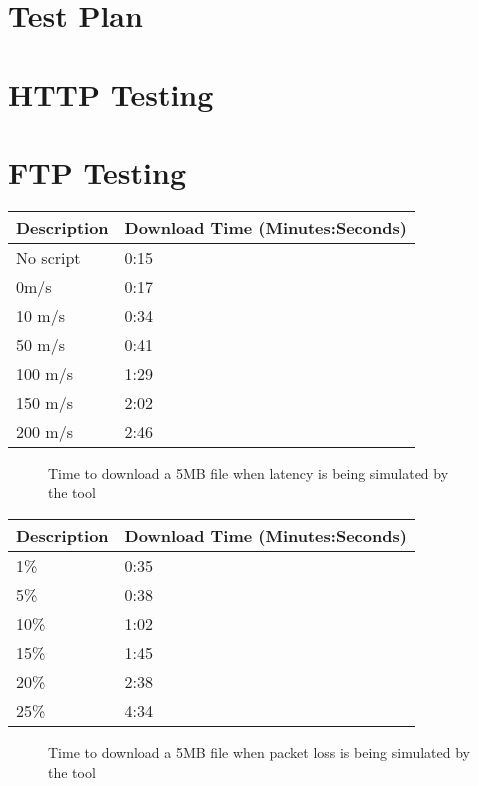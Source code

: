 \begin{appendices}

%
\chapter{Test Plan}
\label{ref:testplan}


\chapter{HTTP Testing}
\label{ref:httpTesting}

\chapter{FTP Testing}
\label{ref:ftpTesting}
\begin{center}

\begin{tabular}{| l | l |}
	\hline
	{\bf Description} 	& {\bf Download Time (Minutes:Seconds)} \\\hline
	No script			& 0:15 \\\hline
	0m/s				& 0:17 \\\hline
	10 	m/s				& 0:34 \\\hline
	50 	m/s				& 0:41 \\\hline
	100 m/s				& 1:29 \\\hline
	150 m/s				& 2:02 \\\hline
	200 m/s				& 2:46 \\\hline
		
\end{tabular}
\begin{figure}[h]
		\caption{Time to download a 5MB file when latency is being simulated by the tool}
	\end{figure}	

\begin{tabular}{| l | l |}
	\hline
	{\bf Description} 	& {\bf Download Time (Minutes:Seconds)} \\\hline
	1\%					& 0:35 \\\hline
	5\%					& 0:38 \\\hline
	10\%				& 1:02 \\\hline
	15\%				& 1:45 \\\hline
	20\%				& 2:38 \\\hline
	25\%				& 4:34 \\\hline
\end{tabular}
\begin{figure}[h]
		\caption{Time to download a 5MB file when packet loss is being simulated by the tool}
\end{figure}	
\end{center}


\end{appendices}

